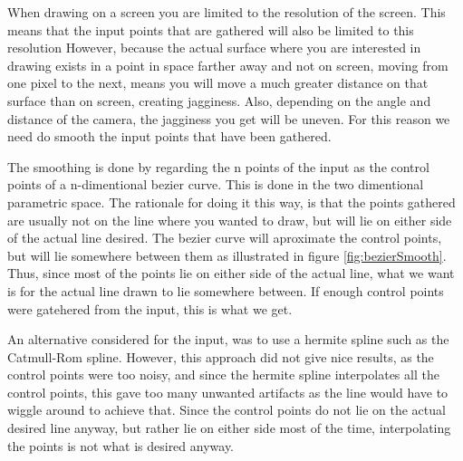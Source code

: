 \documentclass[a4paper,12pt]{report}
\begin{document}
When drawing on a screen you are limited to the resolution of the screen. This means that the input points that are gathered will also be limited to this resolution However, because the actual surface where you are interested in drawing exists in a point in space farther away and not on screen, moving from one pixel to the next, means you will move a much greater distance on that surface than on screen, creating jagginess. Also, depending on the angle and distance of the camera, the jagginess you get will be uneven. For this reason we need do smooth the input points that have been gathered. 

The smoothing is done by regarding the n points of the  input as the control points of a n-dimentional bezier curve. This is done in the two dimentional parametric space. The rationale for doing it this way, is that the points gathered are usually not on the line where you wanted to draw, but will lie on either side of the actual line desired. The bezier curve will aproximate the control points, but will lie somewhere between them as illustrated in figure \ref{fig:bezierSmooth}. Thus, since most of the points lie on either side of the actual line, what we want is for the actual line drawn to lie somewhere between. If enough control points were gatehered from the input, this is what we get.

An alternative considered for the input, was to use a hermite spline such as the Catmull-Rom spline. However, this approach did not give nice results, as the control points were too noisy, and since the hermite spline interpolates all the control points, this gave too many unwanted artifacts as the line would have to wiggle around to achieve that. Since the control points do not lie on the actual desired line anyway, but rather lie on either side most of the time, interpolating the points is not what is desired anyway.
\end{document}
